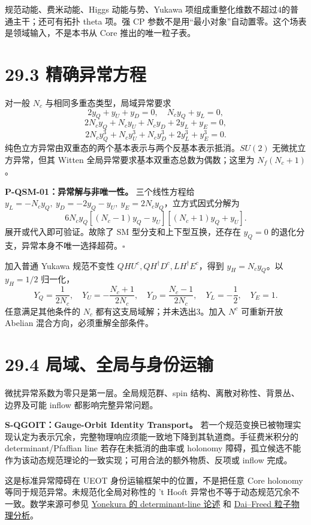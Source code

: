 \documentclass[
  11pt,
  oneside]{book}
\begin{document}
规范动能、费米动能、Higgs 动能与势、Yukawa
项组成重整化维数不超过4的普通主干；还可有拓扑 theta 项。强 CP
参数不是用``最小对象''自动置零。这个场表是领域输入，不是本书从 Core
推出的唯一粒子表。

\hypertarget{ux7cbeux786eux5f02ux5e38ux65b9ux7a0b}{%
\section{29.3 精确异常方程}\label{ux7cbeux786eux5f02ux5e38ux65b9ux7a0b}}

对一般 \(N_c\) 与相同多重态类型，局域异常要求 \[
2y_Q+y_U+y_D=0,\quad N_cy_Q+y_L=0,
\] \[
2N_cy_Q+N_cy_U+N_cy_D+2y_L+y_E=0,
\] \[
2N_cy_Q^3+N_cy_U^3+N_cy_D^3+2y_L^3+y_E^3=0.
\] 纯色立方异常由双重态的两个基本表示与两个反基本表示抵消。\(SU(2)\)
无微扰立方异常，但其 Witten 全局异常要求基本双重态总数为偶数；这里为
\(N_f(N_c+1)\)。

\protect\hypertarget{p-qsm-01}{}{}

\textbf{P-QSM-01：异常解与非唯一性。} 三个线性方程给
\(y_L=-N_cy_Q,\ y_D=-2y_Q-y_U,\ y_E=2N_cy_Q\)，立方式因式分解为 \[
6N_cy_Q[(N_c-1)y_Q-y_U][(N_c+1)y_Q+y_U].
\] 展开或代入即可验证。故除了 SM 型分支和上下型互换，还存在 \(y_Q=0\)
的退化分支，异常本身不唯一选择超荷。\(\square\)

加入普通 Yukawa 规范不变性 \(QHU^c,QH^\dagger D^c,LH^\dagger E^c\)，得到
\(y_H=N_cy_Q\)。以 \(y_H=1/2\) 归一化， \[
Y_Q=\frac1{2N_c},\quad
Y_U=-\frac{N_c+1}{2N_c},\quad
Y_D=\frac{N_c-1}{2N_c},\quad Y_L=-\frac12,\quad Y_E=1.
\] 任意满足其他条件的 \(N_c\) 都有这支局域解；并未选出3。加入 \(N^c\)
可重新开放 Abelian 混合方向，必须重解全部条件。

\hypertarget{ux5c40ux57dfux5168ux5c40ux4e0eux8eabux4efdux8fd0ux8f93}{%
\section{29.4
局域、全局与身份运输}\label{ux5c40ux57dfux5168ux5c40ux4e0eux8eabux4efdux8fd0ux8f93}}

微扰异常系数为零只是第一层。全局规范群、spin
结构、离散对称性、背景丛、边界及可能 inflow 都影响完整异常问题。

\textbf{S-QGOIT：Gauge-Orbit Identity Transport。}
若一个规范变换已被物理实现认定为表示冗余，完整物理响应须能一致地下降到其轨道商。手征费米积分的
determinant/Pfaffian line 若存在未抵消的曲率或 holonomy
障碍，孤立候选不能作为该动态规范理论的一致实现；可用合法的额外物质、反项或
inflow 完成。

这是标准异常障碍在 UEOT 身份运输框架中的位置，不是把任意 Core holonomy
等同于规范异常。未规范化全局对称性的 't Hooft
异常也不等于动态规范冗余不一致。数学来源可参见
\href{https://arxiv.org/abs/1607.01873}{Yonekura 的 determinant-line
论述} 和 \href{https://arxiv.org/abs/1808.00009}{Dai--Freed
粒子物理分析}。
\end{document}
